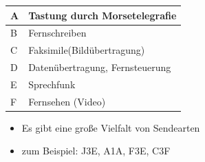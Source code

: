 \begin{frame}
\begin{tiny}
\begin{minipage}{0.4\textwidth}
\begin{tabular}{|l|l|}
        \hline
        A & Tastung durch Morsetelegrafie\\ \hline
        B & Fernschreiben \\ \hline
        C & Faksimile(Bildübertragung)\\ \hline
        D & Datenübertragung, Fernsteuerung\\ \hline
        E & Sprechfunk \\ \hline
        F & Fernsehen (Video)\\ \hline
      \end{tabular}
    \end{minipage}
  \end{tiny}
  \vspace{0.5cm}
  \begin{itemize}
    \item Es gibt eine große Vielfalt von Sendearten
    \item zum Beispiel: J3E, A1A, F3E, C3F
  \end{itemize}
\end{frame}




